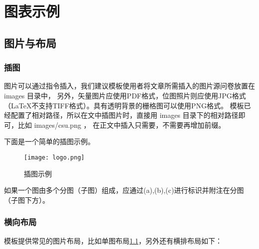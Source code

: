 \chapter{图表示例}

\section{图片与布局}

\subsection{插图}

图片可以通过指令插入，我们建议模板使用者将文章所需插入的图片源问卷放置在 images 目录中，
另外，矢量图片应使用PDF格式，位图照片则应使用JPG格式（LaTeX不支持TIFF格式）。具有透明背景的栅格图可以使用PNG格式。
模板已经配置了相对路径，所以在文中插图片时，直接用 images 目录下的相对路径即可，比如 images/csu.png ，
在正文中插入只需要，不需要再增加前缀。

下面是一个简单的插图示例。

\begin{figure}[hbt]
    \centering
    \texttt{[image: logo.png]}
    \caption{插图示例}
    \label{f.example}
\end{figure}


如果一个图由多个分图（子图）组成，应通过(a),(b),(c)进行标识并附注在分图（子图下方）。

\subsection{横向布局}

模板提供常见的图片布局，比如单图布局\ref{f.example}，另外还有横排布局如下：

